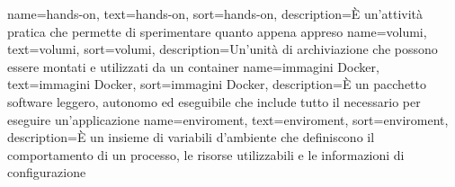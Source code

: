 {
    name={hands-on},
    text=hands-on,
    sort=hands-on,
    description={È un'attività pratica che permette di sperimentare quanto appena appreso}
}
{
    name={volumi},
    text=volumi,
    sort=volumi,
    description={Un'unità di archiviazione che possono essere montati e utilizzati da un container}
}
{
    name={immagini Docker},
    text=immagini Docker,
    sort=immagini Docker,
    description={È un pacchetto software leggero, autonomo ed eseguibile che include tutto il necessario per eseguire un'applicazione}
}
{
    name={enviroment},
    text=enviroment,
    sort=enviroment,
    description={È un insieme di variabili d'ambiente che definiscono il comportamento di un processo, le risorse utilizzabili e le informazioni di configurazione}
}